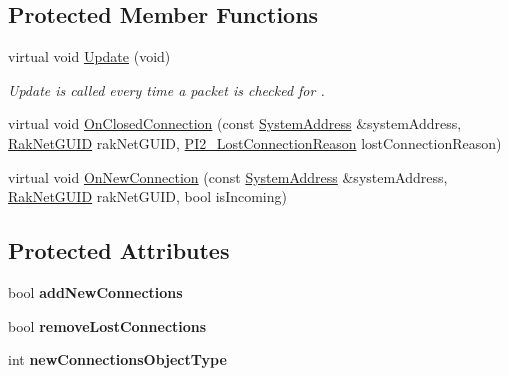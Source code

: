 \subsection*{Protected Member Functions}
\begin{DoxyCompactItemize}
\item 
\hypertarget{class_rak_net_1_1_statistics_history_plugin_abfccea594c8d8f1552165ccce94fb2df}{virtual void \hyperlink{class_rak_net_1_1_statistics_history_plugin_abfccea594c8d8f1552165ccce94fb2df}{Update} (void)}\label{class_rak_net_1_1_statistics_history_plugin_abfccea594c8d8f1552165ccce94fb2df}

\begin{DoxyCompactList}\small\item\em Update is called every time a packet is checked for . \end{DoxyCompactList}\item 
virtual void \hyperlink{class_rak_net_1_1_statistics_history_plugin_ab5ebf87908bf551ef3158ef36cc45a3c}{On\-Closed\-Connection} (const \hyperlink{struct_rak_net_1_1_system_address}{System\-Address} \&system\-Address, \hyperlink{struct_rak_net_1_1_rak_net_g_u_i_d}{Rak\-Net\-G\-U\-I\-D} rak\-Net\-G\-U\-I\-D, \hyperlink{group___p_l_u_g_i_n___i_n_t_e_r_f_a_c_e___g_r_o_u_p_ga376cc546fd6892c2ead48cd51796c8b8}{P\-I2\-\_\-\-Lost\-Connection\-Reason} lost\-Connection\-Reason)
\item 
virtual void \hyperlink{class_rak_net_1_1_statistics_history_plugin_ae2bb9b2a23fc692a3622c3783ca9ed8c}{On\-New\-Connection} (const \hyperlink{struct_rak_net_1_1_system_address}{System\-Address} \&system\-Address, \hyperlink{struct_rak_net_1_1_rak_net_g_u_i_d}{Rak\-Net\-G\-U\-I\-D} rak\-Net\-G\-U\-I\-D, bool is\-Incoming)
\end{DoxyCompactItemize}
\subsection*{Protected Attributes}
\begin{DoxyCompactItemize}
\item 
\hypertarget{class_rak_net_1_1_statistics_history_plugin_a94bfb94e789031fa78ef728fc8544fde}{bool {\bfseries add\-New\-Connections}}\label{class_rak_net_1_1_statistics_history_plugin_a94bfb94e789031fa78ef728fc8544fde}

\item 
\hypertarget{class_rak_net_1_1_statistics_history_plugin_a448b5029ab120a28e783d2102815b724}{bool {\bfseries remove\-Lost\-Connections}}\label{class_rak_net_1_1_statistics_history_plugin_a448b5029ab120a28e783d2102815b724}

\item 
\hypertarget{class_rak_net_1_1_statistics_history_plugin_a2d46e15a2c049be73a25ebc68684a81b}{int {\bfseries new\-Connections\-Object\-Type}}\label{class_rak_net_1_1_statistics_history_plugin_a2d46e15a2c049be73a25ebc68684a81b}

\end{DoxyCompactItemize}


